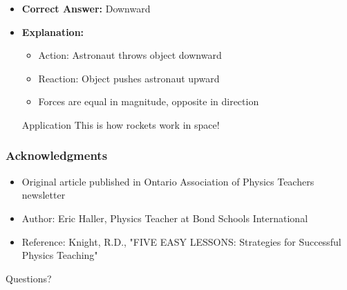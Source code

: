 \documentclass{beamer}
\begin{document}
\begin{frame}
\begin{itemize}
    \item \textbf{Correct Answer:} Downward
    \pause
    \item \textbf{Explanation:}
    \pause
    \begin{itemize}
        \item Action: Astronaut throws object downward
        \item Reaction: Object pushes astronaut upward
        \item Forces are equal in magnitude, opposite in direction
    \end{itemize}
    \pause
    \begin{alertblock}{Application}
        This is how rockets work in space!
    \end{alertblock}
\end{itemize}
\end{frame}



\begin{frame}
\frametitle{Acknowledgments}
\begin{itemize}
    \item Original article published in Ontario Association of Physics Teachers newsletter
    \pause
    \item Author: Eric Haller, Physics Teacher at Bond Schools International
    \pause
    \item Reference: Knight, R.D., "FIVE EASY LESSONS: Strategies for Successful Physics Teaching"
\pause
\end{itemize}
\begin{center}
    \Large{Questions?}
\end{center}
\end{frame}
\end{document}
